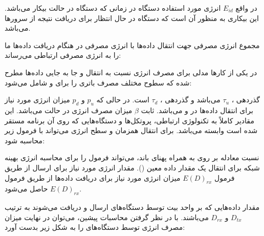 \documentclass[a4paper]{article}
\begin{document}
در واقع $E_{id}$ انرژی مورد استفاده دستگاه  در زمانی که دستگاه در حالت
بیکار می‌باشد. این بیکاری به منظور آن است که دستگاه  در حال انتظار برای
دریافت نتیجه از سرور‌ها می‌باشد.


مجموع انرژی مصرفی جهت انتقال داده‌ها با انرژی مصرفی در هنگام دریافت داده‌ها ما
را به انرژی مصرفی ارتباطی می‌رساند:


در یکی از کار‌ها \cite{huang2012close} مدلی برای مصرف انرژی نسبت به انتقال و جا
به جایی داده‌ها مطرح شده که سطوح مختلف مصرف باتری را برای  و
 شامل می‌شود:


گذردهی ، $\tau_u$ می‌باشد و گذردهی ، $\tau_d$ است. در
حالی که $p_u$ و $p_d$ میزان انرژی مورد نیاز برای انتقال داده‌ها در  و
 می‌باشد. ثابت $\beta$ میزان مصرف انرژی در حالت  می‌باشد.
این مقادیر کاملاً به تکنولوژی ارتباطی، پروتکل‌ها و دستگاه‌هایی که روی آن برنامه
مستقر شده است وابسته می‌‌باشد. برای انتقال همزمان  و 
سطح انرژی می‌تواند با فرمول زیر محاسبه شود:


نسبت معادله  بر روی  به همراه پهنای باند، می‌تواند فرمول
را برای محاسبه انرژی بهینه شبکه برای انتقال یک مقدار داده معین (). مقدار انرژی مورد نیاز برای ارسال از طریق فرمول $E(D)_{rx}$ میزان انرژی
مورد نیاز برای دریافت داده‌ها از طریق فرمول $E(D)_{rx}$ حاصل می‌شود.


مقدار داده‌هایی که بر واحد بیت توسط دستگاه‌های  ارسال و دریافت می‌شوند
به ترتیب $D_{tx}$ و $D_{rx}$ می‌باشند. با در نظر گرفتن محاسبات پیشین، می‌توان در
نهایت میزان مصرف انرژی توسط دستگاه‌های  را به شکل زیر بدست آورد:

\end{document}
